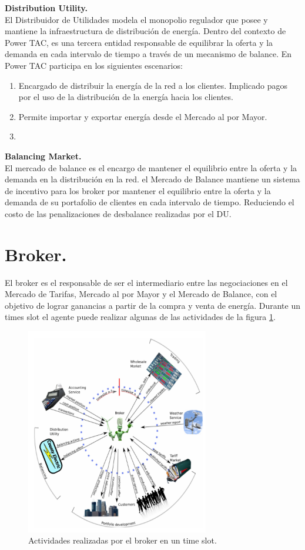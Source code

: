 \textbf{Distribution Utility.}\\

El Distribuidor de Utilidades modela el monopolio regulador que posee y mantiene la infraestructura de distribución de energía. Dentro del contexto de Power TAC, es una tercera entidad responsable de equilibrar la oferta y la demanda en cada intervalo de tiempo a través de un mecanismo de balance.  En Power TAC participa en los siguientes escenarios:

\begin{enumerate}
    \item Encargado de distribuir la energía de la red a los clientes. Implicado pagos por el uso de la distribución de la energía hacia los clientes.
    \item Permite importar y exportar energía desde el Mercado al por Mayor.
    \item 
\end{enumerate}

\textbf{Balancing Market.}\\

El mercado de balance es el encargo de mantener el equilibrio entre la oferta y la demanda en la distribución en la red. el Mercado de Balance mantiene un sistema de incentivo para los broker por mantener el equilibrio entre la oferta y la demanda de su portafolio de clientes en cada intervalo de tiempo. Reduciendo el costo de las penalizaciones de desbalance realizadas por el DU.

\section{Broker.}

El broker es el responsable de ser el intermediario entre las negociaciones en el Mercado de Tarifas, Mercado al por Mayor y el Mercado de Balance, con el objetivo de lograr ganancias a partir de la compra y venta de energía. Durante un times slot el agente puede realizar algunas de las actividades de la figura \ref{activity}.

\begin{figure}[!h]
    \centering
    \includegraphics[width=8cm]{img/process.png}
    \caption{Actividades realizadas por el broker en un time slot.}
    \label{activity}
\end{figure}

